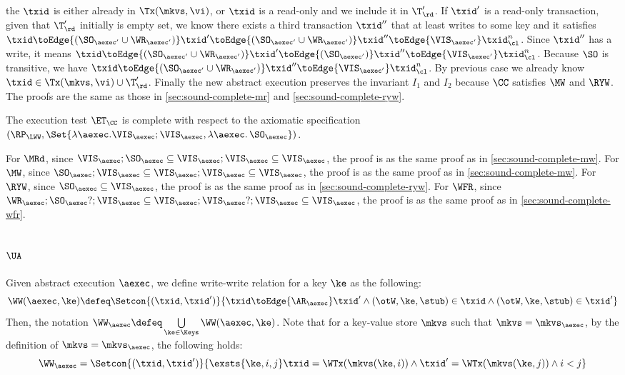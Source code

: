 the \( \txid \) is either already in \( \Tx(\mkvs, \vi) \), 
or \( \txid \) is a read-only and we include it in \( \T'_\rd \).
If \( \txid' \) is a read-only transaction,
given that \( \T'_\rd \) initially is empty set,
we know there exists a third transaction \( \txid'' \) that at least writes to some key
and it satisfies \( \txid \toEdge{( \SO_{\aexec'} \cup \WR_{\aexec'} )}  \txid' \toEdge{( \SO_{\aexec'} \cup \WR_{\aexec'} )}  \txid'' \toEdge{\VIS_{\aexec'}} \txid_\cl^n \).
Since \( \txid'' \) has a write, it means 
\( \txid \toEdge{( \SO_{\aexec'} \cup \WR_{\aexec'} )}  \txid' \toEdge{( \SO_{\aexec'} )}  \txid'' \toEdge{\VIS_{\aexec'}} \txid_\cl^n \).
Because \( \SO \) is transitive, we have \( \txid \toEdge{( \SO_{\aexec'} \cup \WR_{\aexec'} )} \txid'' \toEdge{\VIS_{\aexec'}} \txid_\cl^n \).
By previous case we already know \( \txid \in \Tx(\mkvs, \vi) \cup \T'_\rd \).
Finally the new abstract execution preserves the invariant \( I_1 \) and \( I_2 \) 
because  \( \CC \) satisfies \( \MW \) and \( \RYW \).
The proofs are the same as those in \cref{sec:sound-complete-mr} and \cref{sec:sound-complete-ryw}.

The execution test $\ET_\CC$ is complete with respect to the axiomatic specification 
\( (\RP_{\LWW}, \Set{\lambda \aexec. \VIS_{\aexec} ; \VIS_{\aexec}, \lambda \aexec \ldotp \SO_\aexec })\).

For \( \MRd \), since \(  \VIS_\aexec ; \SO_\aexec \subseteq  \VIS_\aexec ; \VIS_{\aexec} \subseteq \VIS_\aexec \),
the proof is as the same proof as in \cref{sec:sound-complete-mw}.
For \( \MW \), since \( \SO_\aexec ; \VIS_\aexec \subseteq  \VIS_\aexec ; \VIS_{\aexec} \subseteq \VIS_\aexec \),
the proof is as the same proof as in \cref{sec:sound-complete-mw}.
For \( \RYW \), since \( \SO_\aexec \subseteq \VIS_\aexec \),
the proof is as the same proof as in \cref{sec:sound-complete-ryw}.
For \( \WFR \), since \( \WR_\aexec ; \SO_\aexec? ; \VIS_\aexec \subseteq \VIS_\aexec ; \VIS_{\aexec}? ; \VIS_\aexec \subseteq \VIS_\aexec \),
the proof is as the same proof as in \cref{sec:sound-complete-wfr}.


\subsection{\( \UA \)}
\label{sec:sound-complete-ua}

Given abstract execution \( \aexec \), we define write-write relation for a key \( \ke \) as the following:
\[ 
    \WW(\aexec,\ke) \defeq \Setcon{(\txid, \txid')}{\txid \toEdge{\AR_\aexec} \txid' \land (\otW,\ke, \stub ) \in \txid \land (\otW,\ke, \stub ) \in \txid'  } 
\]
Then, the notation \( \WW_\aexec \defeq \bigcup\limits_{\ke \in \Keys} \WW(\aexec, \ke) \).
Note that for a key-value store \( \mkvs \) such that \( \mkvs = \mkvs_\aexec \),
by the definition of  \(  \mkvs = \mkvs_\aexec \), 
the following holds:
\[
    \WW_\aexec = \Setcon{(\txid, \txid')}{\exsts{\ke, i,j } \txid = \WTx(\mkvs(\ke, i)) \land \txid' = \WTx(\mkvs(\ke, j)) \land i < j}
\]

